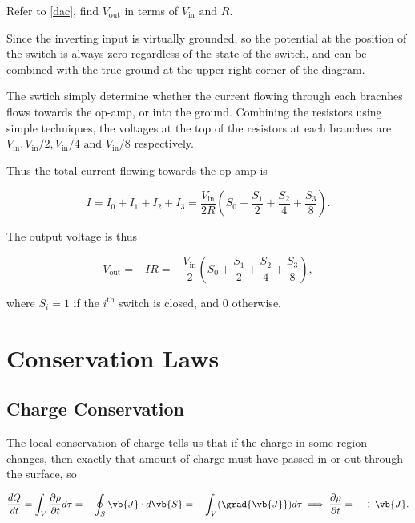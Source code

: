 \documentclass[english,a4paper,12pt]{report}
\begin{document}
{Refer to \cref{dac}, find \(V_{\text{out} } \) in terms of \(V_{\text{in} }\text { and } R \).  }
{Since the inverting input is virtually grounded, so the potential at the position of the switch is always zero regardless of the state of the switch, and can be combined with the true ground at the upper right corner of the diagram.

The swtich simply determine whether the current flowing through each bracnhes flows towards the op-amp, or into the ground. Combining the resistors using simple techniques, the voltages at the top of the resistors at each branches are \(V_{\text{in} }, V_{\text{in} } /2, V_{\text{in} } /4  \text { and } V_{\text{in} }/8  \) respectively. 

Thus the total current flowing towards the op-amp is

\begin{equation}
    I = I_0 + I_1 + I_2 + I_3 = \frac{V_{\text{in} } }{2R}\left( S_0 + \frac{S_1}{2} + \frac{S_2 }{4} + \frac{S_3}{8} \right). 
\end{equation}

The output voltage is thus 

\begin{equation}
    V_{\text{out} } = - IR =  - \frac{V_{\text{in} } }{2}\left( S_0 + \frac{S_1}{2} + \frac{S_2 }{4} + \frac{S_3}{8} \right),
\end{equation}

where \(S_{i} = 1\) if the \(i^{\text{th}} \) switch is closed, and 0 otherwise.   
} 



\chapter{Conservation Laws}

\section{Charge Conservation}

The local conservation of charge tells us that if the charge in some region changes, then exactly that amount of charge must have passed in or out through the surface, so 

\begin{equation}
    \frac{dQ}{dt} = \int_{V}^{} \frac{\partial \rho }{\partial t} d\tau =   -\oint_{S} \vb{J} \cdot d\vb{S}  = -\int_{V}^{} (\grad{\vb{J} } ) d\tau   \implies \frac{\partial \rho }{\partial t} = - \div{\vb{J} }.   \label{contincharge} 
\end{equation}
\end{document}
